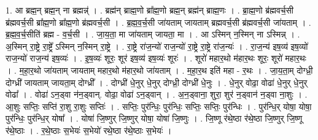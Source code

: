 \documentclass[17pt]{extarticle}
\begin{document}
1. आ ब्रह्म॒न् ब्रह्म॒न् ना ब्रह्मन्न्॑ । . ब्रह्म॑न् ब्राह्म॒णो ब्रा᳚ह्म॒णो ब्रह्म॒न् ब्रह्म॑न् ब्राह्म॒णः । . ब्रा॒ह्म॒णो ब्र॑ह्मवर्च॒सी ब्र॑ह्मवर्च॒सी ब्रा᳚ह्म॒णो ब्रा᳚ह्म॒णो ब्र॑ह्मवर्च॒सी । . ब्र॒ह्म॒व॒र्च॒सी जा॑यताम् जायताम् ब्रह्मवर्च॒सी ब्र॑ह्मवर्च॒सी जा॑यताम् । . ब्र॒ह्म॒व॒र्च॒सीति॑ ब्रह्म - व॒र्च॒सी । . जा॒य॒ता॒ मा जा॑यताम् जायता॒ मा । . आ ऽस्मिन् न॒स्मिन् ना ऽस्मिन्न् । . अ॒स्मिन् रा॒ष्ट्रे रा॒ष्ट्रे᳚ ऽस्मिन् न॒स्मिन् रा॒ष्ट्रे । . रा॒ष्ट्रे रा॑ज॒न्यो॑ राज॒न्यो॑ रा॒ष्ट्रे रा॒ष्ट्रे रा॑ज॒न्यः॑ । . रा॒ज॒न्य॑ इष॒व्य॑ इष॒व्यो॑ राज॒न्यो॑ राज॒न्य॑ इष॒व्यः॑ । . इ॒ष॒व्यः॑ शूरः॒ शूर॑ इष॒व्य॑ इष॒व्यः॑ शूरः॑ । . शूरो॑ महार॒थो म॑हार॒थः शूरः॒ शूरो॑ महार॒थः । . म॒हा॒र॒थो जा॑यताम् जायताम् महार॒थो म॑हार॒थो जा॑यताम् । . म॒हा॒र॒थ इति॑ महा - र॒थः । . जा॒य॒ता॒म् दोग्ध्री॒ दोग्ध्री॑ जायताम् जायता॒म् दोग्ध्री᳚ । . दोग्ध्री॑ धे॒नुर् धे॒नुर् दोग्ध्री॒ दोग्ध्री॑ धे॒नुः । . धे॒नुर् वोढा॒ वोढा॑ धे॒नुर् धे॒नुर् वोढा᳚ । . वोढा॑ ऽन॒ड्वा न॑न॒ड्वान्. वोढा॒ वोढा॑ ऽन॒ड्वान् । . अ॒न॒ड्वाना॒ शुरा॒ शुर॑ न॒ड्वान॑ न॒ड्वा ना॒शुः । . आ॒शुः सप्तिः॒ सप्ति॑ रा॒शु रा॒शुः सप्तिः॑ । . सप्तिः॒ पुर॑न्धिः॒ पुर॑न्धिः॒ सप्तिः॒ सप्तिः॒ पुर॑न्धिः । . पुर॑न्धि॒र् योषा॒ योषा॒ पुर॑न्धिः॒ पुर॑न्धि॒र् योषा᳚ । . योषा॑ जि॒ष्णुर् जि॒ष्णुर् योषा॒ योषा॑ जि॒ष्णुः । . जि॒ष्णू र॑थे॒ष्ठा र॑थे॒ष्ठा जि॒ष्णुर् जि॒ष्णू र॑थे॒ष्ठाः । . र॒थे॒ष्ठाः स॒भेयः॑ स॒भेयो॑ रथे॒ष्ठा र॑थे॒ष्ठाः स॒भेयः॑ । \newline
\end{document}
